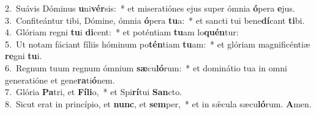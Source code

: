{2.~}Suávis Dóminus \textbf{u}ni\textbf{vér}sis:~* et miseratiónes ejus super ómnia \textbf{ó}pera \textbf{e}jus.\\
{3.~}Confiteántur tibi, Dómine, ómnia \textbf{ó}pera \textbf{tu}a:~* et sancti tui bene\textbf{dí}cant \textbf{ti}bi.\\
{4.~}Glóriam regni \textbf{tu}i \textbf{di}cent:~* et poténtiam \textbf{tu}am lo\textbf{quén}tur:\\
{5.~}Ut notam fáciant fíliis hóminum po\textbf{tén}tiam \textbf{tu}am:~* et glóriam magnificéntiæ \textbf{re}gni \textbf{tu}i.\\
{6.~}Regnum tuum regnum ómnium \textbf{sæ}cu\textbf{ló}rum:~* et dominátio tua in omni generatióne et gene\textbf{ra}ti\textbf{ó}nem.\\
{7.~}Glória \textbf{Pa}tri, et \textbf{Fí}\textbf{li}o,~* et Spi\textbf{rí}tui \textbf{San}cto.\\
{8.~}Sicut erat in princípio, et \textbf{nunc}, et \textbf{sem}per,~* et in sǽcula sæcu\textbf{ló}rum. \textbf{A}men.\\
